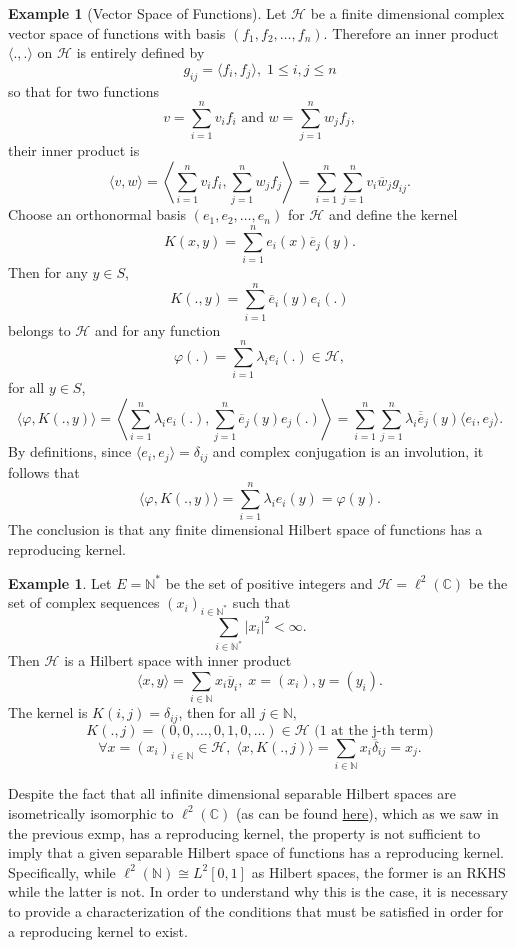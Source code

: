 \documentclass[psamsfonts]{amsart}
\theoremstyle{definition}
\newtheorem{exmp}[thm]{Example}
\theoremstyle{remark}
\numberwithin{equation}{section}
\begin{document}
\begin{exmp}[Vector Space of Functions]
Let $\mathcal{H}$ be a finite dimensional complex vector space of functions with basis $(f_1, f_2, \dots , f_n).$ Therefore an inner product $\langle . , . \rangle$ on $\mathcal{H}$ is entirely defined by 
$$ g_{ij} = \langle f_i, f_j \rangle, \; 1 \leq i, j \leq n$$
so that for two functions 
$$v = \sum _{i =1} ^n v_i f_i \text{ and } w = \sum ^n _{j = 1} w_j f_j, $$
their inner product is 
$$\langle v, w \rangle = \left\langle \sum _{i =1} ^n v_i f_i , \sum ^n _{j = 1} w_j f_j \right\rangle = \sum _{i = 1} ^n \sum _{j = 1} ^n v_i \overline{w}_j g_{ij}.$$
Choose an orthonormal basis $(e_1, e_2, \dots , e_n)$ for $\mathcal{H}$ and define the kernel 
$$K(x,y) = \sum _{i =1} ^n e_i (x) \overline{e} _j (y). $$
Then for any $y \in S$, 
$$K(. , y) = \sum ^n _{i = 1} \overline{e} _i (y) e_i (.)$$
belongs to $\mathcal{H}$ and for any function 
$$\varphi (.) = \sum ^n _{i = 1} \lambda _i e_i (.) \in \mathcal{H}, $$
for all $y \in S$, 
$$\langle \varphi , K(., y) \rangle = \left\langle \sum ^n _{i =1} \lambda_i e_i (.), \sum _{j=1} ^n \overline{e}_j (y) e_j (.) \right\rangle = \sum ^n _{i = 1} \sum ^n _{j = 1} \lambda _i \overline{\overline{e}}_j (y) \langle e_i, e_j \rangle.$$
By definitions, since $\langle e_i, e_j \rangle = \delta _{ij}$ and complex conjugation is an involution, it follows that 
$$\langle \varphi , K(., y) \rangle =  \sum _{i = 1} ^n \lambda _i e_i (y) = \varphi (y). $$
The conclusion is that any finite dimensional Hilbert space of functions has a reproducing kernel. 
\end{exmp}

\begin{exmp}
Let $E = \mathbb{N}^*$ be the set of positive integers and $\mathcal{H} = \ell ^2 (\mathbb{C})$ be the set of complex sequences $(x_i) _{i \in \mathbb{N}^*}$ such that 
$$\sum _{i \in \mathbb{N}^*} | x_i | ^2 < \infty. $$
Then $\mathcal{H}$ is a Hilbert space with inner product 
$$\langle x, y \rangle = \sum _{i \in \mathbb{N}} x_i \overline{y}_i, \; x = (x_i), y = (y_i). $$
The kernel is $K(i, j) = \delta_{ij}$, then for all $j \in \mathbb{N},$
$$K(., j) = (0, 0, \dots, 0, 1, 0, ...) \in \mathcal{H} \text{ (1 at the j-th term)} $$
$$\forall x = (x_i)_{i \in \mathbb{N}} \in \mathcal{H}, \; \langle x , K(., j) \rangle = \sum _{i \in \mathbb{N}} x_i \overline{\delta}_{ij} = x_j.$$
\end{exmp}

Despite the fact that all infinite dimensional separable Hilbert spaces are isometrically isomorphic to $\ell ^2 (\mathbb{C})$ (as can be found \href{http://mathonline.wikidot.com/separable-hilbert-spaces-are-isometrically-isomorphic-to-2}{here}), which as we saw in the previous exmp, has a reproducing kernel, the property is not sufficient to imply that a given separable Hilbert space of functions has a reproducing kernel. Specifically, while $\ell ^2 (\mathbb{N}) \cong L^2[0,1]$ as Hilbert spaces, the former is an RKHS while the latter is not. In order to understand why this is the case, it is necessary to provide a characterization of the conditions that must be satisfied in order for a reproducing kernel to exist. 
\end{document}
